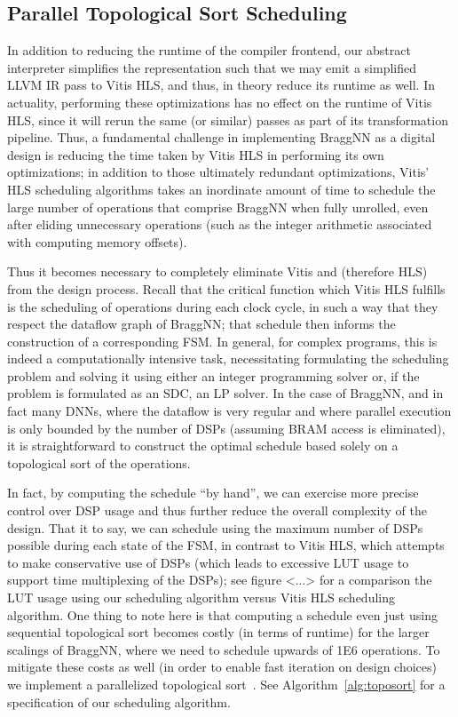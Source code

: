\subsection{Parallel Topological Sort Scheduling}\label{subsec:parallel-toposort-scheduling}

In addition to reducing the runtime of the compiler frontend, our abstract interpreter simplifies the representation such that we may emit a simplified LLVM IR pass to Vitis HLS, and thus, in theory reduce its runtime as well.
In actuality, performing these optimizations has no effect on the runtime of Vitis HLS, since it will rerun the same (or similar) passes as part of its transformation pipeline.
Thus, a fundamental challenge in implementing BraggNN as a digital design is reducing the time taken by Vitis HLS in performing its own optimizations; in addition to those ultimately redundant optimizations, Vitis' HLS scheduling algorithms takes an inordinate amount of time to schedule the large number of operations that comprise BraggNN when fully unrolled, even after eliding unnecessary operations (such as the integer arithmetic associated with computing memory offsets).

Thus it becomes necessary to completely eliminate Vitis and (therefore HLS) from the design process.
Recall that the critical function which Vitis HLS fulfills is the scheduling of operations during each clock cycle, in such a way that they respect the dataflow graph of BraggNN; that schedule then informs the construction of a corresponding FSM.
In general, for complex programs, this is indeed a computationally intensive task, necessitating formulating the scheduling problem and solving it using either an integer programming solver or, if the problem is formulated as an SDC, an LP solver.
In the case of BraggNN, and in fact many DNNs, where the dataflow is very regular and where parallel execution is only bounded by the number of DSPs (assuming BRAM access is eliminated), it is straightforward to construct the optimal schedule based solely on a topological sort of the operations.

In fact, by computing the schedule ``by hand'', we can exercise more precise control over DSP usage and thus further reduce the overall complexity of the design.
That it to say, we can schedule using the maximum number of DSPs possible during each state of the FSM, in contrast to Vitis HLS, which attempts to make conservative use of DSPs (which leads to excessive LUT usage to support time multiplexing of the DSPs); see figure <...> for a comparison the LUT usage using our scheduling algorithm versus Vitis HLS scheduling algorithm.
One thing to note here is that computing a schedule even just using sequential topological sort becomes costly (in terms of runtime) for the larger scalings of BraggNN, where we need to schedule upwards of 1E6 operations.
To mitigate these costs as well (in order to enable fast iteration on design choices) we implement a parallelized topological sort~\cite{sanders2019sequential}.
See Algorithm~\ref{alg:toposort} for a specification of our scheduling algorithm.

